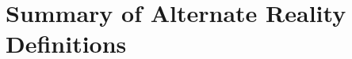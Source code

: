 
\section{Summary of Alternate Reality Definitions}
\label{summaryofalternaterealitydefinitions}



